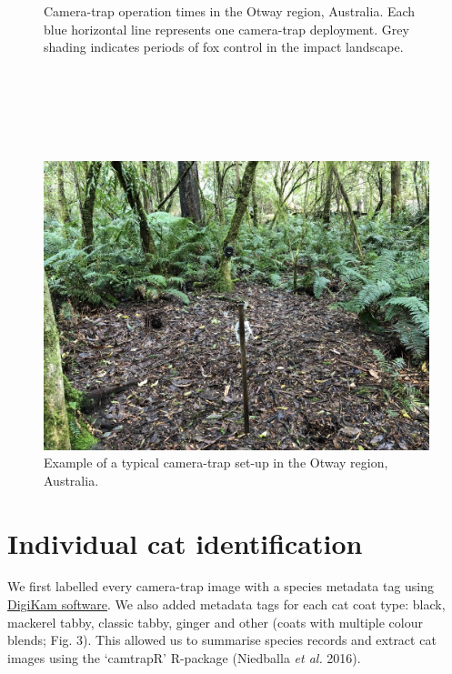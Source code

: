 \documentclass[11pt,a4paper,titlepage,twoside,openright]{style/unimelbthesis}
\begin{document}
\begin{mainmatter}
\begin{figure}
{}

\caption{Camera-trap operation times in the Otway region, Australia. Each blue horizontal line represents one camera-trap deployment. Grey shading indicates periods of fox control in the impact landscape.}\label{fig:density-camop}
\end{figure}
\newpage

\(~\)

\(~\)

\(~\)
\begin{figure}

{\centering \includegraphics[width=1\linewidth]{figure/camtrap1} 

}

\caption{Example of a typical camera-trap set-up in the Otway region, Australia.}\label{fig:density-cam-photo}
\end{figure}
\newpage

\hypertarget{density-app-id}{%
\section{Individual cat identification}\label{density-app-id}}

We first labelled every camera-trap image with a species metadata tag using \href{https://www.digikam.org}{DigiKam software}. We also added metadata tags for each cat coat type: black, mackerel tabby, classic tabby, ginger and other (coats with multiple colour blends; Fig. 3). This allowed us to summarise species records and extract cat images using the `camtrapR' R-package (Niedballa \emph{et al.} 2016).


\end{mainmatter}
\end{document}

